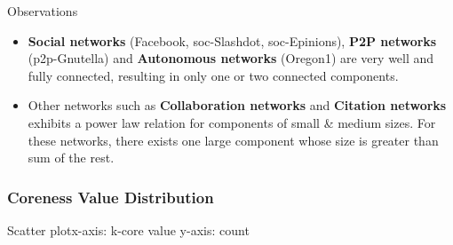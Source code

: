 Observations
\begin{itemize}
\item \textbf{Social networks} (Facebook, soc-Slashdot, soc-Epinions), \textbf{P2P networks} (p2p-Gnutella) and \textbf{Autonomous networks} (Oregon1) are very well and fully connected, resulting in only one or two connected components.
\item Other networks such as \textbf{Collaboration networks} and \textbf{Citation networks} exhibits a power law relation for components of small \& medium sizes. For these networks, there exists one large component whose size is greater than sum of the rest. 
\end{itemize}


\subsubsection{Coreness Value Distribution}

Scatter plot\quad x-axis: k-core value \quad y-axis: count

